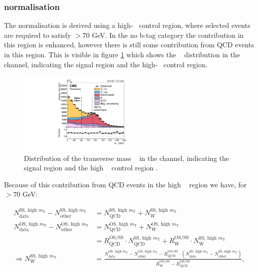 \subsubsection{\texorpdfstring{\Wjets normalisation}{W+jets normalisation}}
\label{sec:mssm_bkgs_mtet_wjetsnorm}
The \Wjets normalisation is derived using a high-\mT~ control region, where
selected events are required to satisfy \mT$>70$ GeV. In the no b-tag
category the \Wjets
contribution in this region is enhanced, however there is still
some contribution from QCD events in this region. This is visible in 
figure \ref{fig:mssm_bkgs_wjets_mutau_mt} which shows the \mT~ distribution in the
\mutau channel, indicating the signal region and the high-\mT~ control region. 

\begin{figure}[h!]
\begin{center}
\includegraphics[width=0.5\textwidth]{./MSSM/Figures/CMS-PAS-HIG-16-037_Figure_002.pdf}
\end{center}
\caption{Distribution of the transverse mass \mT~ in the \mutau channel, indicating
the signal region and the high \mT~ control region \cite{CMS-PAS-HIG-16-037}.}
\label{fig:mssm_bkgs_wjets_mutau_mt}
\end{figure}

Because of this contribution from QCD events in the high \mT~ region we
have, for \mT$>70$ GeV:

\begin{equation}\label{eqn:wjets_ss_norm}
\begin{split}
N_{\text{data}}^{\text{SS, high } m_{\text{T}}} - N_{\text{other}}^{\text{SS,
 high } m_{\text{T}}} & =
N_{\text{QCD}}^{\text{SS, high } m_{\text{T}}} + N_{\text{W}}^{\text{SS, high } m_{\text{T}}} ~\\
N_{\text{data}}^{\text{OS, high } m_{\text{T}}} - N_{\text{other}}^{\text{OS,
 high } m_{\text{T}}} & = N_{\text{QCD}}^{\text{OS, high } m_{\text{T}}} +
N_{\text{W}}^{\text{OS, high } m_{\text{T}}} \\
& = R_{\text{QCD}}^{\text{OS/SS}}\cdot N_{\text{QCD}}^{\text{SS, high } m_{\text{T}}} +
R_{\text{W}}^{\text{OS/SS}} \cdot N_{\text{W}}^{\text{SS, high } m_{\text{T}}} ~\\
\Rightarrow N_{\text{W}}^{\text{SS, high } m_{\text{T}}}  &= \frac{N_{\text{data}}^{\text{OS,
 high } m_{\text{T}}}  - N_{\text{other}}^{\text{OS, high } m_{\text{T}}}  -
R_{\text{QCD}}^{\text{OS/SS}}\cdot(N_{\text{data}}^{\text{SS, high } m_{\text{T}}}  -
N_{\text{other}}^{\text{SS, high } m_{\text{T}}} )}{R_{\text{W}}^{\text{OS/SS}} -
R_{\text{QCD}}^{\text{OS/SS}}} ,
\end{split}
\end{equation}

